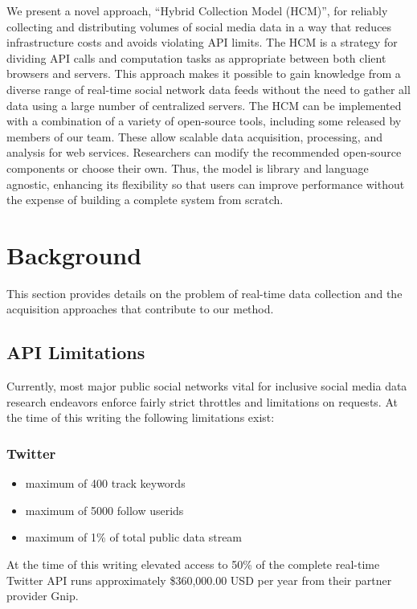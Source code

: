 \documentclass[letterpaper]{article}
\begin{document}
We present a novel approach, ``Hybrid Collection Model (HCM)'', for reliably collecting and distributing volumes of social media data in a way that reduces infrastructure costs and avoids violating API limits. The HCM is a strategy for dividing API calls and computation tasks as appropriate between both client browsers and servers. This approach makes it possible to gain knowledge from a diverse range of real-time social network data feeds without the need to gather all data using a large number of centralized servers. The HCM can be implemented with a combination of a variety of open-source tools, including some released by members of our team. These allow scalable data acquisition, processing, and analysis for web services. Researchers can modify the recommended open-source components or choose their own. Thus, the model is library and language agnostic, enhancing its flexibility so that users can improve performance without the expense of building a complete system from scratch.

\section{Background}

This section provides details on the problem of real-time data collection and the acquisition approaches that contribute to our method.

\subsection{API Limitations}

Currently, most major public social networks vital for inclusive social media data research endeavors enforce fairly strict throttles and limitations on requests. At the time of this writing the following limitations exist:

\subsubsection{Twitter} 
\begin{itemize}
\item maximum of 400 track keywords
\item maximum of 5000 follow userids
\item maximum of 1\% of total public data stream
\end{itemize}
At the time of this writing elevated access to 50\% of the complete real-time Twitter API runs approximately \$360,000.00 USD per year from their partner provider Gnip.
\end{document}
